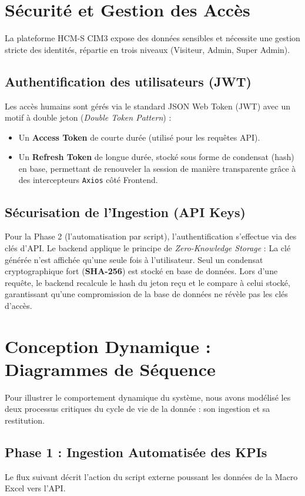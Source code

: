 \section{Sécurité et Gestion des Accès}
La plateforme HCM-S CIM3 expose des données sensibles et nécessite une gestion stricte des identités, répartie en trois niveaux (Visiteur, Admin, Super Admin).

\subsection{Authentification des utilisateurs (JWT)}
Les accès humains sont gérés via le standard JSON Web Token (JWT) avec un motif à double jeton (\textit{Double Token Pattern}) :
\begin{itemize}
    \item Un \textbf{Access Token} de courte durée (utilisé pour les requêtes API).
    \item Un \textbf{Refresh Token} de longue durée, stocké sous forme de condensat (hash) en base, permettant de renouveler la session de manière transparente grâce à des intercepteurs \texttt{Axios} côté Frontend.
\end{itemize}

\subsection{Sécurisation de l'Ingestion (API Keys)}
Pour la Phase 2 (l'automatisation par script), l'authentification s'effectue via des clés d'API. Le backend applique le principe de \textit{Zero-Knowledge Storage} :
La clé générée n'est affichée qu'une seule fois à l'utilisateur. Seul un condensat cryptographique fort (\textbf{SHA-256}) est stocké en base de données. Lors d'une requête, le backend recalcule le hash du jeton reçu et le compare à celui stocké, garantissant qu'une compromission de la base de données ne révèle pas les clés d'accès.

\section{Conception Dynamique : Diagrammes de Séquence}
Pour illustrer le comportement dynamique du système, nous avons modélisé les deux processus critiques du cycle de vie de la donnée : son ingestion et sa restitution.

\subsection{Phase 1 : Ingestion Automatisée des KPIs}
Le flux suivant décrit l'action du script externe poussant les données de la Macro Excel vers l'API.

